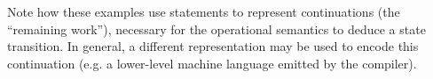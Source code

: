 \begin{description}
    Note how these examples use statements to represent continuations (the “remaining work”), necessary for the operational semantics to deduce a state transition.
    In general, a different representation may be used to encode this continuation (e.g. a lower-level machine language emitted by the compiler).
    
    \begin{comment}
    In order to determine the next program state (or detect termination), a state must have a notion of “upcoming work”, usually represented by a statement internally.
    TODO: reasonable to call that “continuation”?
    
    Let $\setProgramState_s$ (with $s \in \setStmt$) be the set of program states having $s$ as upcoming work.
    This notion will be necessary to define soundness of \svl's static semantics.
    
    Examples:
    \begin{description}
        \item[Primitive]
        \begin{flalign*}
        	 & \setProgramState ~=~ \underbrace{(\setVar \rightharpoonup \mathbb{Z})}_{\textit{variable memory}} ~\times~ \setStmt & ~ \\
        	 & \setProgramState_s ~=~ (\setVar \rightharpoonup \mathbb{Z}) ~\times~ \setStmt_s                                     &
        \end{flalign*}
        
        \item[Stack]
        \begin{flalign*}
        	 & \setProgramState ~=~ \bigcup_{i \in \mathbb{N}_+}{\underbrace{\Big((\setVar \rightharpoonup \mathbb{Z}) ~\times~ \setStmt \Big)}_{\textit{stack frame}}}^i                                                                                \\
        	 & \setProgramState_s ~=~ \Big((\setVar \rightharpoonup \mathbb{Z}) ~\times~ \setStmt_s\Big) ~\times~ \underbrace{\bigcup_{i \in \mathbb{N}_0}{\Big((\setVar \rightharpoonup \mathbb{Z}) ~\times~ \setStmt \Big)^i}}_{\textit{lower frames}}
        \end{flalign*}
    \end{description}
     
    TODO: notion of initial state?
    \end{comment}
    

\end{description}
